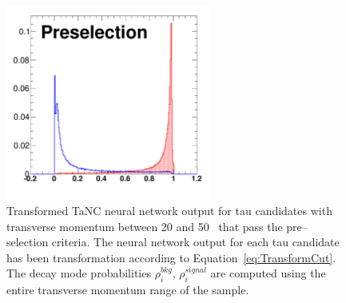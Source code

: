 %
\begin{figure}[thbp]
   \setlength{\unitlength}{1mm}
   \begin{center}
     \includegraphics*[width=0.6\textwidth]{tanc_chapter/figures/NNOutput_transform_5_200_preselection.pdf}
   \caption[Transformed neural network output]{Transformed TaNC neural network
   output for tau candidates with transverse momentum between 20 and 50~\GeVc
   that pass the pre--selection criteria.  The neural network output for each
   tau candidate has been transformation according to
   Equation~\ref{eq:TransformCut}.  The decay mode probabilities
   $\rho^{bkg}_i$, $\rho^{signal}_i$ are computed using the entire transverse
   momentum range of the sample.  } \label{fig:transformedNNOutput}
   \end{center}
\end{figure}
